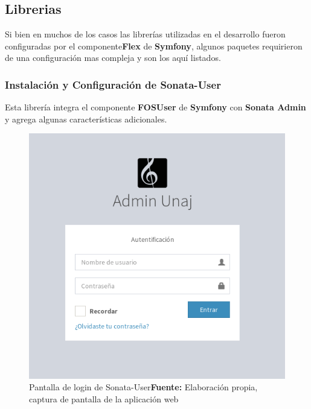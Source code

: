 
\subsection{Librerias}%
\label{sub:librerias}

Si bien en muchos de los casos las librerías utilizadas en el desarrollo fueron configuradas por el componente\textbf{Flex}  de \textbf{Symfony}, algunos paquetes
requirieron de una configuración mas compleja y son los aquí listados.

\subsubsection{Instalación y Configuración de \textbf{Sonata-User}}%
\label{ssub:instalacion_y_configuración_de_sonata-user}

Esta librería integra el componente \textbf{FOSUser} de \textbf{Symfony} con \textbf{Sonata Admin} y agrega algunas características adicionales.

\begin{figure}[h]
    \includegraphics[width=1\linewidth]{image/adminLogin.png}
    \caption{Pantalla de login de Sonata-User\newline \textbf{Fuente:} Elaboración propia, captura de pantalla de la aplicación web}
    \label{fig:image/adminLogin}
\end{figure}



